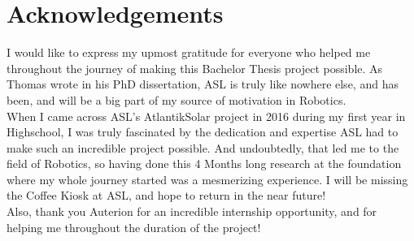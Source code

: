 \chapter*{Acknowledgements}

I would like to express my upmost gratitude for everyone who helped me throughout the journey of making this Bachelor Thesis project possible. As Thomas wrote in his PhD dissertation\cite{stastny_low-altitude_2020}, ASL is truly like nowhere else, and has been, and will be a big part of my source of motivation in Robotics.\\

When I came across ASL's AtlantikSolar project in 2016 during my first year in Highschool, I was truly fascinated by the dedication and expertise ASL had to make such an incredible project possible. And undoubtedly, that led me to the field of Robotics, so having done this 4 Months long research at the foundation where my whole journey started was a mesmerizing experience. I will be missing the Coffee Kiosk at ASL, and hope to return in the near future!\\

Also, thank you Auterion for an incredible internship opportunity, and for helping me throughout the duration of the project!